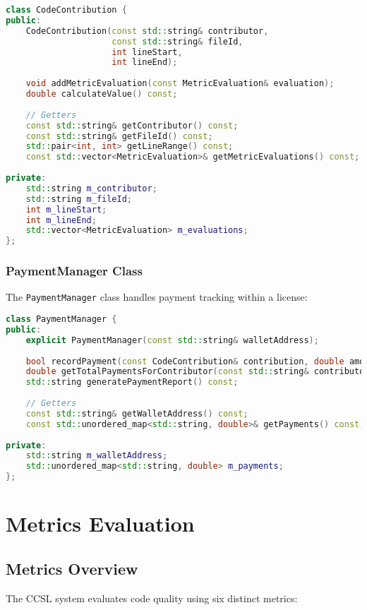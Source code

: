 \documentclass[11pt,a4paper]{report}
\begin{document}
\begin{lstlisting}[language=C++]
class CodeContribution {
public:
    CodeContribution(const std::string& contributor, 
                     const std::string& fileId,
                     int lineStart, 
                     int lineEnd);
    
    void addMetricEvaluation(const MetricEvaluation& evaluation);
    double calculateValue() const;
    
    // Getters
    const std::string& getContributor() const;
    const std::string& getFileId() const;
    std::pair<int, int> getLineRange() const;
    const std::vector<MetricEvaluation>& getMetricEvaluations() const;
    
private:
    std::string m_contributor;
    std::string m_fileId;
    int m_lineStart;
    int m_lineEnd;
    std::vector<MetricEvaluation> m_evaluations;
};
\end{lstlisting}

\subsection{PaymentManager Class}
The \texttt{PaymentManager} class handles payment tracking within a license:

\begin{lstlisting}[language=C++]
class PaymentManager {
public:
    explicit PaymentManager(const std::string& walletAddress);
    
    bool recordPayment(const CodeContribution& contribution, double amount);
    double getTotalPaymentsForContributor(const std::string& contributor) const;
    std::string generatePaymentReport() const;
    
    // Getters
    const std::string& getWalletAddress() const;
    const std::unordered_map<std::string, double>& getPayments() const;
    
private:
    std::string m_walletAddress;
    std::unordered_map<std::string, double> m_payments;
};
\end{lstlisting}

\chapter{Metrics Evaluation}

\section{Metrics Overview}
The CCSL system evaluates code quality using six distinct metrics:
\end{document}
